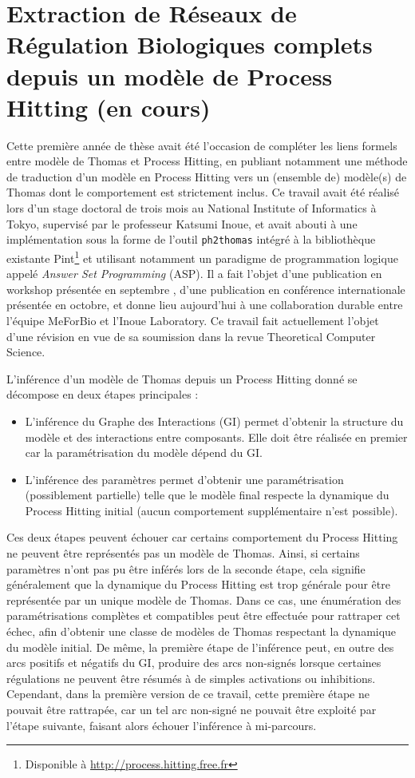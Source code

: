 \section{Extraction de Réseaux de Régulation Biologiques complets depuis un modèle de Process Hitting \normalsize(en cours)}

Cette première année de thèse avait été l'occasion de compléter les liens formels entre modèle de Thomas et Process Hitting,
en publiant notamment une méthode de traduction d'un modèle en Process Hitting vers un (ensemble de) modèle(s) de Thomas dont le comportement est strictement inclus.
Ce travail avait été réalisé lors d'un stage doctoral de trois mois au National Institute of Informatics à Tokyo, supervisé par le professeur Katsumi Inoue, et avait abouti à une implémentation sous la forme de l'outil \texttt{ph2thomas} intégré à la bibliothèque existante Pint\footnote{Disponible à \url{http://process.hitting.free.fr}} et utilisant notamment un paradigme de programmation logique appelé \emph{Answer Set Programming} (ASP).
Il a fait l'objet d'une publication en workshop présentée en septembre \cite{FPIMR12-LDSSB}, d'une publication en conférence internationale \cite{FPIMR12-CMSB} présentée en octobre, et donne lieu aujourd'hui à une collaboration durable entre l'équipe MeForBio et l'Inoue Laboratory.
Ce travail fait actuellement l'objet d'une révision en vue de sa soumission dans la revue Theoretical Computer Science.

L'inférence d'un modèle de Thomas depuis un Process Hitting donné se décompose en deux étapes principales :
\begin{itemize}
  \item L'inférence du Graphe des Interactions (GI) permet d'obtenir la structure du modèle et des interactions entre composants.
  Elle doit être réalisée en premier car la paramétrisation du modèle dépend du GI.
  \item L'inférence des paramètres permet d'obtenir une paramétrisation (possiblement partielle) telle que le modèle final respecte la dynamique du Process Hitting initial (aucun comportement supplémentaire n'est possible).
\end{itemize}
Ces deux étapes peuvent échouer car certains comportement du Process Hitting ne peuvent être représentés pas un modèle de Thomas.
Ainsi, si certains paramètres n'ont pas pu être inférés lors de la seconde étape, cela signifie généralement que la dynamique du Process Hitting est trop générale pour être représentée par un unique modèle de Thomas.
Dans ce cas, une énumération des paramétrisations complètes et compatibles peut être effectuée pour rattraper cet échec, afin d'obtenir une classe de modèles de Thomas respectant la dynamique du modèle initial.
De même, la première étape de l'inférence peut, en outre des arcs positifs et négatifs du GI, produire des arcs non-signés lorsque certaines régulations ne peuvent être résumés à de simples activations ou inhibitions.
Cependant, dans la première version de ce travail, cette première étape ne pouvait être rattrapée,
car un tel arc non-signé ne pouvait être exploité par l'étape suivante, faisant alors échouer l'inférence à mi-parcours.

